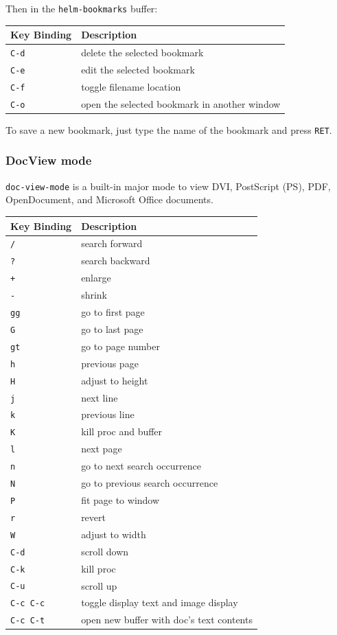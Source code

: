 \documentclass[11pt]{article}
\begin{document}
Then in the \texttt{helm-bookmarks} buffer:

\begin{center}
\begin{tabular}{ll}
Key Binding & Description\\
\hline
\texttt{C-d} & delete the selected bookmark\\
\texttt{C-e} & edit the selected bookmark\\
\texttt{C-f} & toggle filename location\\
\texttt{C-o} & open the selected bookmark in another window\\
\end{tabular}
\end{center}

To save a new bookmark, just type the name of the bookmark and press \texttt{RET}.

\subsubsection{DocView mode}
\label{sec:orgd7d46e3}
\texttt{doc-view-mode} is a built-in major mode to view DVI, PostScript (PS), PDF,
OpenDocument, and Microsoft Office documents.

\begin{center}
\begin{tabular}{ll}
Key Binding & Description\\
\hline
\texttt{/} & search forward\\
\texttt{?} & search backward\\
\texttt{+} & enlarge\\
\texttt{-} & shrink\\
\texttt{gg} & go to first page\\
\texttt{G} & go to last page\\
\texttt{gt} & go to page number\\
\texttt{h} & previous page\\
\texttt{H} & adjust to height\\
\texttt{j} & next line\\
\texttt{k} & previous line\\
\texttt{K} & kill proc and buffer\\
\texttt{l} & next page\\
\texttt{n} & go to next search occurrence\\
\texttt{N} & go to previous search occurrence\\
\texttt{P} & fit page to window\\
\texttt{r} & revert\\
\texttt{W} & adjust to width\\
\texttt{C-d} & scroll down\\
\texttt{C-k} & kill proc\\
\texttt{C-u} & scroll up\\
\texttt{C-c C-c} & toggle display text and image display\\
\texttt{C-c C-t} & open new buffer with doc's text contents\\
\end{tabular}
\end{center}
\end{document}
